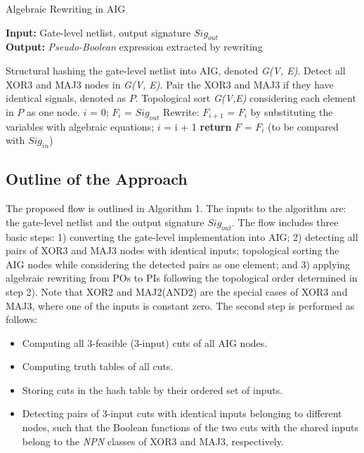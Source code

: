 \begin{algorithm}
\scriptsize
\caption{Algebraic Rewriting in AIG}\label{alg:algorithm}
\textbf{Input:} Gate-level netlist, output signature $Sig_{out}$  \\
\textbf{Output:} \textit{Pseudo-Boolean} expression extracted by rewriting 
\begin{algorithmic}[1]
\State Structural hashing the gate-level netlist into AIG, denoted \textit{G(V, E)}.
\State Detect all XOR3 and MAJ3 nodes in \textit{G(V, E)}.
\State Pair the XOR3 and MAJ3 if they have identical signals, denoted as $P$.
\State Topological sort \textit{G(V,E)} considering each element in $P$ as one node.
\State $i$ = 0; $F_{i}$ = $Sig_{out}$
\State Rewrite: $F_{i+1}$ = $F_{i}$ by substituting the variables with algebraic equations;
\State $i$ = i + 1
\EndWhile
\State \textbf{return} $F$ = $F_{i}$ (to be compared with $Sig_{in}$)
\end{algorithmic}
\end{algorithm}


\subsection{Outline of the Approach}

The proposed flow is outlined in Algorithm 1. The inputs to the algorithm are: the gate-level netlist and the output signature $Sig_{out}$. The flow includes three basic steps: 1) converting the gate-level implementation into AIG; 2) detecting all pairs of XOR3 and MAJ3 nodes with identical inputs; topological sorting the AIG nodes while considering the detected pairs as one element; and 3) applying algebraic rewriting from POs to PIs following the topological order determined in step 2). Note that XOR2 and MAJ2(AND2) are the special cases of XOR3 and MAJ3, where one of the inputs is constant zero. The second step is performed as follows: 

\begin{itemize}

\item Computing all 3-feasible (3-input) cuts of all AIG nodes.

\item Computing truth tables of all cuts.

\item Storing cuts in the hash table by their ordered set of inputs.

\item Detecting pairs of 3-input cuts with identical inputs belonging to different nodes, such that the Boolean functions of the two cuts with the shared inputs belong to the \textit{NPN} classes of XOR3 and MAJ3, respectively.

\end{itemize}

